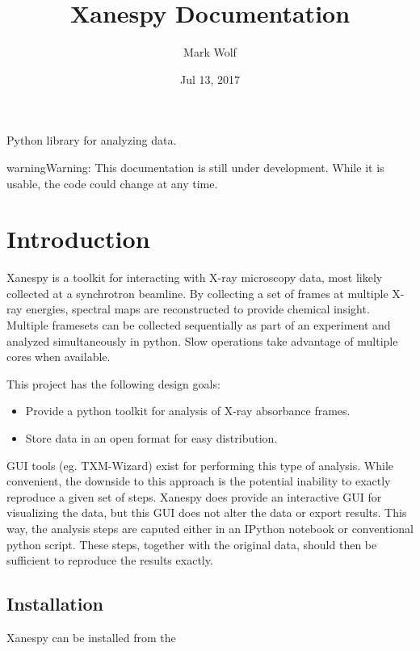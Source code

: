 \documentclass[letterpaper,10pt,english]{sphinxmanual}
\title{Xanespy Documentation}
\date{Jul 13, 2017}
\author{Mark Wolf}
\begin{document}
\maketitle
\sphinxtableofcontents
{}\label{\detokenize{index::doc}}


Python library for analyzing  data.

\begin{sphinxadmonition}{warning}{Warning:}
This documentation is still under development. While it is usable, the code
could change at any time.
\end{sphinxadmonition}


\chapter{Introduction}
\label{\detokenize{intro::doc}}\label{\detokenize{intro:introduction}}\label{\detokenize{intro:xanespy-documentation}}
Xanespy is a toolkit for interacting with X-ray microscopy data, most
likely collected at a synchrotron beamline. By collecting a set of
frames at multiple X-ray energies, spectral maps are reconstructed to
provide chemical insight. Multiple framesets can be collected
sequentially as part of an  experiment and analyzed
simultaneously in python. Slow operations take advantage of multiple
cores when available.

This project has the following design goals:
\begin{itemize}
\item {} 
Provide a python toolkit for analysis of X-ray absorbance frames.

\item {} 
Store data in an open format for easy distribution.

\end{itemize}

GUI tools (eg. TXM-Wizard) exist for performing this type of
analysis. While convenient, the downside to this approach is the
potential inability to exactly reproduce a given set of steps. Xanespy
does provide an interactive GUI for visualizing the data, but this GUI
does not alter the data or export results. This way, the analysis
steps are caputed either in an IPython notebook or conventional python
script. These steps, together with the original data, should then be
sufficient to reproduce the results exactly.


\section{Installation}
\label{\detokenize{intro:installation}}
Xanespy can be installed from the 
\end{document}
